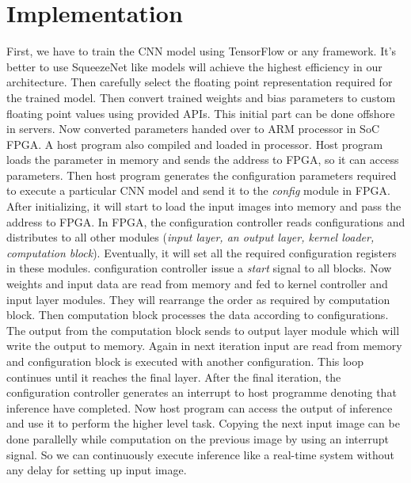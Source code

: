 \documentclass[conference]{IEEEtran}
\begin{document}
\section{Implementation}

First, we have to train the CNN model using TensorFlow or any framework. It's better to use SqueezeNet like models will achieve the highest efficiency in our architecture. Then carefully select the floating point representation required for the trained model. Then convert trained weights and bias parameters to custom floating point values using provided APIs. This initial part can be done offshore in servers. Now converted parameters handed over to ARM processor in SoC FPGA. A host program also compiled and loaded in processor. Host program loads the parameter in memory and sends the address to FPGA, so it can access parameters. Then host program generates the configuration parameters required to execute a particular CNN model and send it to the \textit{config} module in FPGA. After initializing, it will start to load the input images into memory and pass the address to FPGA. 
In FPGA, the configuration controller reads configurations and distributes to all other modules (\textit{input layer, an output layer, kernel loader, computation block}). Eventually, it will set all the required configuration registers in these modules. configuration controller issue a \textit{start} signal to all blocks. Now weights and input data are read from memory and fed to kernel controller and input layer modules. They will rearrange the order as required by computation block. Then computation block processes the data according to configurations. The output from the computation block sends to output layer module which will write the output to memory. Again in next iteration input are read from memory and configuration block is executed with another configuration. This loop continues until it reaches the final layer. After the final iteration, the configuration controller generates an interrupt to host programme denoting that inference have completed. Now host program can access the output of inference and use it to perform the higher level task. Copying the next input image can be done parallelly while computation on the previous image by using an interrupt signal. So we can continuously execute inference like a real-time system without any delay for setting up input image.
\end{document}
